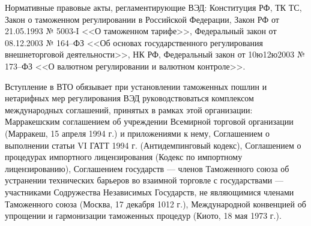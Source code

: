 Нормативные правовые акты, регламентирующие ВЭД: Конституция РФ, ТК ТС, Закон о таможенном регулировании в Российской Федерации, Закон РФ от 21.05.1993 № 5003-I <<О таможенном тарифе>>, Федеральный закон от 08.12.2003 № 164--ФЗ <<Об основах государственного регулирования внешнеторговой деятельности>>, НК РФ, Федеральный закон от 10ю12ю2003 № 173--ФЗ <<О валютном регулировании и валютном контроле>>.

Вступление в ВТО обязывает при установлении таможенных пошлин и нетарифных мер регулирования ВЭД руководствоваться комплексом международных соглашений, принятых в рамках этой организации: Марракешским соглашением об учреждении Всемирной торговой организации (Марракеш, 15 апреля 1994 г.) и приложениями к нему, Соглашением о выполнении статьи VI ГАТТ 1994 г. (Антидемпинговый кодекс), Соглашением о процедурах импортного лицензирования (Кодекс по импортному лицензированию), Соглашением государств --- членов Таможенного союза об устранении технических барьеров во взаимной торговле с государствами --- участниками Содружества Независимых Государств, не являющимися членами Таможенного союза (Москва, 17 декабря 1012 г.), Международной конвенцией об упрощении и гармонизации таможенных процедур (Киото, 18 мая 1973 г.).













